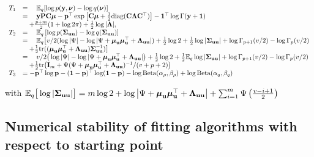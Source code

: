 \documentclass{article}[12pt]
\begin{document}
$$
\begin{array}{rl}
T_1 &= \quad {\mathbb E}_q[\log{p({\bf y}, {\boldsymbol\nu})} - \log{q({\boldsymbol\nu})}] \\
&= \quad {\bf y} {\bf P} {\bf C} {\boldsymbol\mu} - {\bf p}^\top \exp{\left[ {\bf C}{\boldsymbol\mu}+ {\tfrac{1}{2}}\text{diag} ({\bf C}{\boldsymbol\Lambda}{\bf C}^\top) \right]} - {\bf 1}^\top\log \Gamma{({\bf y}+ {\bf1})}\\
& \quad + \frac{p + m}{2} (1 + \log{2 \pi}) + {\tfrac{1}{2}} \log{|{\boldsymbol\Lambda}|}, \\
T_2 &= \quad {\mathbb E}_q \left[ \log p({\boldsymbol \Sigma}_{{\bf u} {\bf u}}) - \log q({\boldsymbol \Sigma}_{{\bf u} {\bf u}}) \right] \\
&= \quad {\mathbb E}_q \big[ v/2(\log |\Psi| - \log |\Psi + {\boldsymbol \mu}_{\bf u} {\boldsymbol \mu}_{\bf u}^\top + {\boldsymbol \Lambda}_{{\bf u} {\bf u}}|) + {\tfrac{1}{2}} \log 2 + {\tfrac{1}{2}} \log|{\boldsymbol \Sigma}_{{\bf u} {\bf u}}| + \log \Gamma_{p+1}(v/2) - \log \Gamma_{p}(v/2)\\
&\quad + {\tfrac{1}{2}} \text{tr}(({\boldsymbol \mu}_{{\bf u}} {\boldsymbol \mu}_{{\bf u}}^\top + {\boldsymbol \Lambda}_{{\bf u} {\bf u}}) {\boldsymbol \Sigma}_{{\bf u} {\bf u}}^{-1}) \big] \\
&= \quad v/2\big(\log |\Psi| - \log |\Psi + {\boldsymbol \mu}_{\bf u} {\boldsymbol \mu}_{\bf u}^\top + {\boldsymbol \Lambda}_{{\bf u} {\bf u}}|\big) + {\tfrac{1}{2}} \log 2 + {\tfrac{1}{2}} {\mathbb E}_q \log |{\boldsymbol \Sigma}_{{\bf u} {\bf u}}| + \log \Gamma_{p+1}(v/2) - \log \Gamma_{p}(v/2) \\
&\quad + {\tfrac{1}{2}} \text{tr}\big({\bf I}_m + \Psi(\Psi+ {\boldsymbol \mu}_{\bf u} {\boldsymbol \mu}_{\bf u}^\top + {\boldsymbol \Lambda}_{{\bf u} {\bf u}})^{-1}/(v + p + 2)\big) \\
T_3 &= - {\bf p}^\top \log {\bf p} - ({\bf 1} - {\bf p})^\top \log ({\bf 1} - {\bf p}) - \log \text{Beta} (\alpha_\rho, \beta_\rho) + \log \text{Beta} (\alpha_q, \beta_q)
\end{array}
$$

with ${\mathbb E}_q \big[ \log |{\boldsymbol \Sigma}_{{\bf u} {\bf u}}| \big] = m \log 2 + \log \left | \Psi + {\boldsymbol \mu}_{\bf u} {\boldsymbol \mu}_{\bf u}^\top + {\boldsymbol \Lambda}_{{\bf u} {\bf u}} \right | + \sum_{i=1}^m \Psi \left ( \frac{v - i + 1}{2} \right )$

\subsection{Numerical stability of fitting algorithms with respect to starting point}




\end{document}
